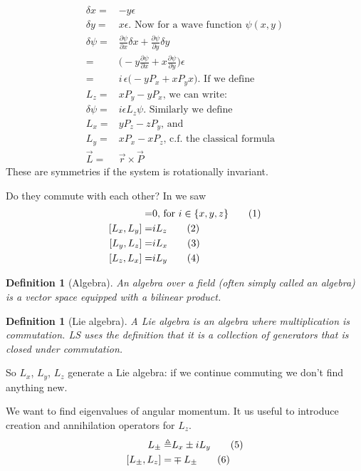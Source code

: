 \documentclass[]{article}
\newcommand\numberthis{\addtocounter{equation}{1}\tag{\theequation}}
\newtheorem{defn}[thm]{Definition}
\begin{document}
\begin{align*}
	\delta x =& - y \epsilon\\
	\delta y =& x \epsilon \text{. Now for a wave function $\psi(x,y)$}\\
	\delta \psi =& \frac{\partial \psi}{\partial x} \delta x + \frac{\partial \psi}{\partial y} \delta y\\
	=&\big( - y \frac{\partial \psi}{\partial x} + x \frac{\partial \psi}{\partial y}\big) \epsilon\\
	=& i \, \epsilon \big(- y P_x + x P_y x\big)  \text{. If we define}\\
	L_z =& x P_y - y P_x \text{, we can write:}\\
	\delta \psi=& i \epsilon L_z \psi\text{. Similarly we define}\\
	L_x =& y P_z - z P_y \text{, and}\\
	L_y =& x P_x - x P_z \text{, c.f. the classical formula}\\
	\vec{L} =& \vec{r} \times \vec{P}
\end{align*}
These are symmetries if the system is rotationally invariant.

Do they commute with each other? In \cite{susskind2014quantum} we saw
\begin{align*}
	[L_i,H]=& 0 \text{, for $i \in \{x,y,z\}$}\numberthis \label{eq:LH}\\
	[L_x,L_y] =& i L_z \numberthis \label{eq:lx_ly}\\
	[L_y,L_z] =& i L_x\numberthis \label{eq:ly_lz}\\
	[L_z,L_x] =& i L_y\numberthis \label{eq:lz_lx}
\end{align*}

\begin{defn}[Algebra]
	An \emph{algebra over a field } (often simply called an algebra) is a vector space equipped with a bilinear product. 
\end{defn}

\begin{defn}[Lie algebra]
	A Lie algebra is an algebra where multiplication is commutation. LS uses the definition that it is a collection of generators that is closed under commutation.
\end{defn}

So $L_x$, $L_y$, $L_z$ generate a Lie algebra: if we continue commuting we don't find anything new.

We want to find eigenvalues of angular momentum. It us useful to introduce creation and annihilation operators for $L_z$.
\begin{align*}
	L_{\pm} \triangleq& L_x \pm i L_y \numberthis \label{eq:comm:Lpm}\\
	[L_{\pm},L_z] =& \mp L_{\pm} \numberthis \label{eq:comm:LpmLz}
\end{align*}
\end{document}
